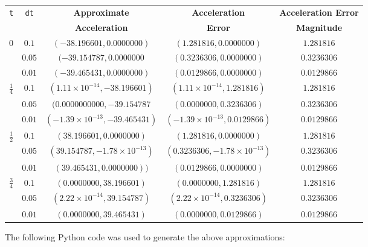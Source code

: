 \documentclass[12pt]{article}
\begin{document}
\begin{table}[H]
    \begin{tabular}{|||c|c|c|c|c|||} \hline \hline \hline
        {\tt t} & {\tt dt} & {\bf Approximate} & {\bf Acceleration} & {\bf Acceleration Error}\\
         & & {\bf Acceleration} & {\bf Error} & {\bf Magnitude} \\ \hline \hline \hline
        $0$ & $0.1$ & $(-38.196601, 0.0000000)$ & $(1.281816, 0.0000000)$ & $1.281816$ \\ \hline
         & $0.05$ & $(-39.154787, 0.0000000$ & $(0.3236306, 0.0000000)$ & $0.3236306$ \\ \hline
         & $0.01$ & $(-39.465431, 0.0000000)$ & $(0.0129866, 0.0000000)$ & $0.0129866$\\ \hline \hline

        $\frac{1}{4}$ & $0.1$ & $(1.11 \times 10^{-14}, -38.196601)$ & $(1.11 \times 10^{-14}, 1.281816)$ & $1.281816$ \\ \hline
         & $0.05$ & $(0.0000000000, -39.154787$ & $(0.0000000, 0.3236306)$ & $0.3236306$ \\ \hline
         & $0.01$ & $(-1.39 \times 10^{-13}, -39.465431)$ & $(-1.39 \times 10^{-13}, 0.0129866)$ & $0.0129866$\\ \hline \hline

        $\frac{1}{2}$ & $0.1$ & $(38.196601, 0.0000000)$ & $(1.281816, 0.0000000)$ & $1.281816$ \\ \hline
         & $0.05$ & $(39.154787, -1.78 \times 10^{-13})$ & $(0.3236306, -1.78 \times 10^{-13})$ & $0.3236306$ \\ \hline
         & $0.01$ & $(39.465431, 0.0000000))$ & $(0.0129866, 0.0000000)$ & $0.0129866$\\ \hline \hline

        $\frac{3}{4}$ & $0.1$ & $(0.0000000, 38.196601)$ & $(0.0000000, 1.281816)$ & $1.281816$ \\ \hline
         & $0.05$ & $(2.22 \times 10^{-14}, 39.154787)$ & $(2.22 \times 10^{-14}, 0.3236306)$ & $0.3236306$ \\ \hline
         & $0.01$ & $(0.0000000, 39.465431)$ & $(0.0000000, 0.0129866)$ & $0.0129866$\\ \hline \hline \hline
    \end{tabular}
\end{table}
The following Python code was used to generate the above approximations:
\end{document}
